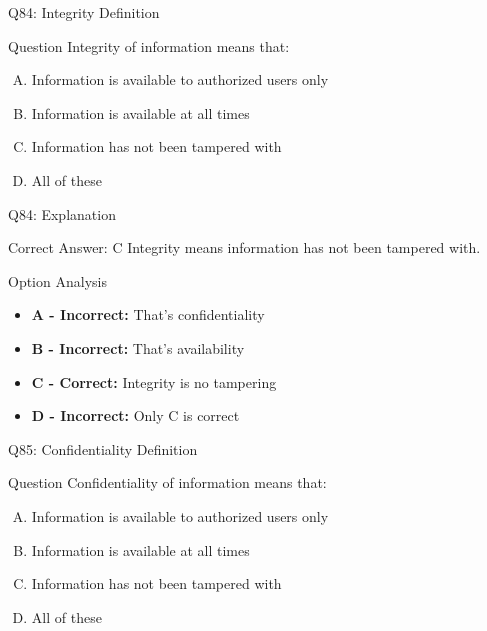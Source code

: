 \documentclass{beamer}
\begin{document}
	\begin{frame}{Q84: Integrity Definition}
		\begin{block}{Question}
			Integrity of information means that:
		\end{block}
		\begin{enumerate}[(A)]
			\item Information is available to authorized users only
			\item Information is available at all times
			\item Information has not been tampered with
			\item All of these
		\end{enumerate}
	\end{frame}
	
	\begin{frame}{Q84: Explanation}
		\begin{block}{Correct Answer: C}
			Integrity means information has not been tampered with.
		\end{block}
		\begin{block}{Option Analysis}
			\begin{itemize}
				\item \textbf{A - Incorrect:} That's confidentiality
				\item \textbf{B - Incorrect:} That's availability
				\item \textbf{C - Correct:} Integrity is no tampering
				\item \textbf{D - Incorrect:} Only C is correct
			\end{itemize}
		\end{block}
	\end{frame}
	
	\begin{frame}{Q85: Confidentiality Definition}
		\begin{block}{Question}
			Confidentiality of information means that:
		\end{block}
		\begin{enumerate}[(A)]
			\item Information is available to authorized users only
			\item Information is available at all times
			\item Information has not been tampered with
			\item All of these
		\end{enumerate}
	\end{frame}
	
\end{document}
